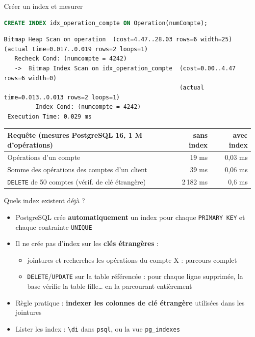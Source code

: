 \documentclass[aspectratio=169,10pt]{beamer}
\begin{document}
\begin{frame}[fragile]{Cr\'eer un index et mesurer}
\begin{lstlisting}[language=SQL]
CREATE INDEX idx_operation_compte ON Operation(numCompte);
\end{lstlisting}
\begin{lstlisting}[style=plan]
 Bitmap Heap Scan on operation  (cost=4.47..28.03 rows=6 width=25) (actual time=0.017..0.019 rows=2 loops=1)
   Recheck Cond: (numcompte = 4242)
   ->  Bitmap Index Scan on idx_operation_compte  (cost=0.00..4.47 rows=6 width=0)
                                                  (actual time=0.013..0.013 rows=2 loops=1)
         Index Cond: (numcompte = 4242)
 Execution Time: 0.029 ms
\end{lstlisting}
  \begin{datacard}
    \small
    \begin{tabular}{@{}lrr@{}}
      \toprule
      \textbf{Requ\^ete (mesures PostgreSQL 16, 1 M d'op\'erations)} & \textbf{sans index} & \textbf{avec index} \\
      \midrule
      Op\'erations d'un compte & 19 ms & 0,03 ms \\
      Somme des op\'erations des comptes d'un client & 39 ms & 0,06 ms \\
      \texttt{DELETE} de 50 comptes (v\'erif. de cl\'e \'etrang\`ere) & \alert{2\,182 ms} & 0,6 ms \\
      \bottomrule
    \end{tabular}
  \end{datacard}
\end{frame}

\begin{frame}{Quels index existent d\'ej\`a ?}
  \begin{itemize}
    \item PostgreSQL cr\'ee \textbf{automatiquement} un index pour chaque \texttt{PRIMARY KEY} et chaque contrainte \texttt{UNIQUE}
    \item Il \alert{ne cr\'ee pas} d'index sur les \textbf{cl\'es \'etrang\`eres} :
      \begin{itemize}
        \item jointures et recherches \og les op\'erations du compte X \fg{} : parcours complet
        \item \texttt{DELETE}/\texttt{UPDATE} sur la table r\'ef\'erenc\'ee : pour chaque ligne supprim\'ee, la base v\'erifie la table fille\ldots{} en la parcourant enti\`erement
      \end{itemize}
    \item[$\Rightarrow$] R\`egle pratique : \textbf{indexer les colonnes de cl\'e \'etrang\`ere} utilis\'ees dans les jointures
    \item Lister les index : \texttt{\textbackslash di} dans \texttt{psql}, ou la vue \texttt{pg\_indexes}
  \end{itemize}
\end{frame}
\end{document}
